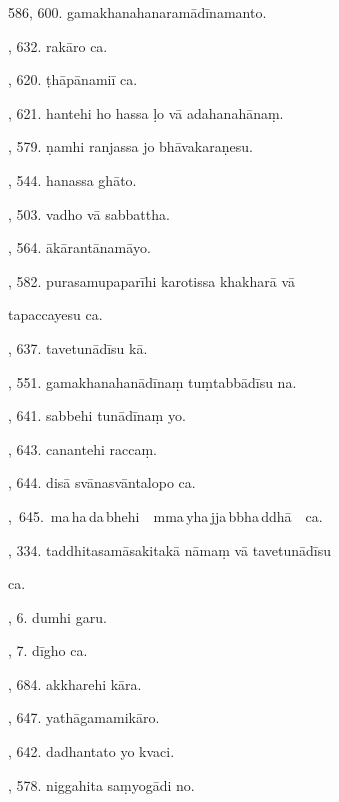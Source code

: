 586, 600. gamakhanahanaramādīnamanto.\hfill \pageref{sut:586}\par {}, 632. rakāro ca.\hfill \pageref{sut:587}\par {}, 620. ṭhāpānamiī ca.\hfill \pageref{sut:588}\par {}, 621. hantehi ho hassa ḷo vā adahanahānaṃ.\hfill \pageref{sut:589}\par {}, 579. ṇamhi ranjassa jo bhāvakaraṇesu.\hfill \pageref{sut:590}\par {}, 544. hanassa ghāto.\hfill \pageref{sut:591}\par {}, 503. vadho vā sabbattha.\hfill \pageref{sut:592}\par {}, 564. ākārantānamāyo.\hfill \pageref{sut:593}\par {}, 582. purasamupaparīhi karotissa khakharā vā\par \noindent
\hspace{15mm} tapaccayesu ca.\hfill \pageref{sut:594}\par {}, 637. tavetunādīsu kā.\hfill \pageref{sut:595}\par {}, 551. gamakhanahanādīnaṃ tuṃtabbādīsu na.\hfill \pageref{sut:596}\par {}, 641. sabbehi tunādīnaṃ yo.\hfill \pageref{sut:597}\par {}, 643. canantehi raccaṃ.\hfill \pageref{sut:598}\par {}, 644. disā svānasvāntalopo ca.\hfill \pageref{sut:599}\par {},~645.~ma\,ha\,da\,bhehi\ \ mma\,yha\,jja\,bbha\,ddhā\ \ ca.\hfill \pageref{sut:600}\par {}, 334. taddhitasamāsakitakā nāmaṃ vā tavetunādīsu\par \noindent
\hspace{15mm} ca.\hfill \pageref{sut:601}\par {}, 6. dumhi garu.\hfill \pageref{sut:602}\par {}, 7. dīgho ca.\hfill \pageref{sut:603}\par {}, 684. akkharehi kāra.\hfill \pageref{sut:604}\par {}, 647. yathāgamamikāro.\hfill \pageref{sut:605}\par {}, 642. dadhantato yo kvaci.\hfill \pageref{sut:606}\par {}, 578. niggahita saṃyogādi no.\hfill \pageref{sut:607}\par \noindent
